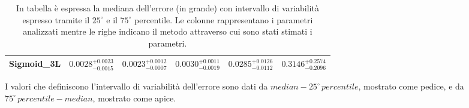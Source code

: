 \documentclass[12pt,a4paper,final]{book}
\newcommand\xrowht[2][0]{\addstackgap[.5\dimexpr#2\relax]{\vphantom{#1}}}
\begin{document}
\begin{table}[!ht]
\begin{adjustbox}{center}
\begin{tabular}{|| c || c | c | c | c | c||}
	\hline\xrowht[()]{20pt}
	\textbf{Sigmoid\_3L} & $0.0028_{-0.0015}^{+0.0023}$ & $0.0023_{-0.0007}^{+0.0012}$ & $0.0030_{-0.0019}^{+0.0011}$ & $0.0285_{-0.0112}^{+0.0126}$ & $0.3146_{-0.2096}^{+0.2574}$\\
	\hline
	\end{tabular}
	\end{adjustbox}
	\caption{In tabella è espressa la mediana dell'errore (in grande) con intervallo di variabilità espresso tramite il $25^\circ$ e il $75^\circ$ percentile. Le colonne rappresentano i parametri analizzati mentre le righe indicano il metodo attraverso cui sono stati stimati i parametri.}
	\label{stats}
\end{table}


I valori che definiscono l'intervallo di variabilità dell'errore sono dati da $median-25^\circ\,percentile$, mostrato come pedice, e da $75^\circ\,percentile-median$, mostrato come apice.
\end{document}
